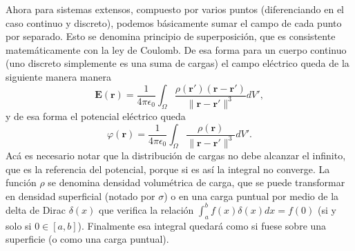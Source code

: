 \documentclass[11pt,a4paper]{article}
\numberwithin{equation}{section}
\begin{document}
Ahora para sistemas extensos, compuesto por varios puntos (diferenciando en el caso continuo y discreto), podemos básicamente sumar el campo de cada punto por separado. Esto se denomina principio de superposición, que es consistente matemáticamente con la ley de Coulomb. De esa forma para un cuerpo continuo (uno discreto simplemente es una suma de cargas) el campo eléctrico queda de la siguiente manera
manera
\begin{equation}
    \textbf{E}(\textbf{r}) = \frac{1}{4\pi\epsilon_0}\int_\Omega \frac{\rho(\textbf{r}') (\textbf{r}-\textbf{r}')}{\|\textbf{r}-\textbf{r}'\|^3} dV',
    \label{eq:e_campo_continuo}
\end{equation}
y de esa forma el potencial eléctrico queda 
\begin{equation}
    \varphi(\textbf{r}) = \frac{1}{4\pi\epsilon_0}\int_\Omega \frac{\rho(\textbf{r})}{\|\textbf{r} - \textbf{r}'\|^3} dV'.
    \label{eq:e_potencial_continuo}
\end{equation}
Acá es necesario notar que la distribución de cargas no debe alcanzar el infinito, que es la referencia del potencial, porque si es así la integral no converge. La función $\rho$ se denomina densidad volumétrica de carga, que se puede transformar en densidad superficial (notado por $\sigma$) o en una carga puntual por medio de la delta de Dirac  $\delta(x)$ \cite{griffiths} que verifica la relación $\displaystyle\int_a^b f(x) \delta(x) dx = f(0)$ (si y solo si $0 \in [a,b]$). Finalmente esa integral quedará como si fuese sobre una superficie (o como una carga puntual).
\end{document}
